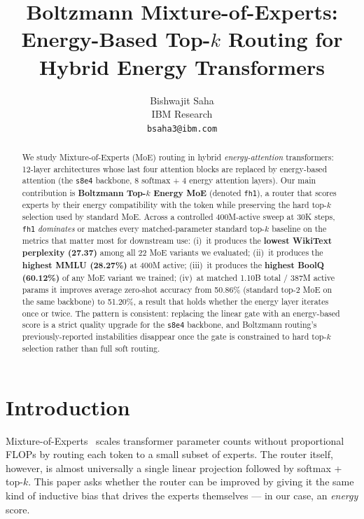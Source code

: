 \documentclass[oneside]{article}
\title{Boltzmann Mixture-of-Experts:\\Energy-Based Top-$k$ Routing for Hybrid Energy Transformers}
\author{
  Bishwajit Saha \\
  IBM Research \\
  \texttt{bsaha3@ibm.com}
}
\begin{document}
\maketitle

\begin{abstract}
We study Mixture-of-Experts (MoE) routing in hybrid \emph{energy-attention} transformers: 12-layer architectures whose last four attention blocks are replaced by energy-based attention (the \texttt{s8e4} backbone, 8 softmax + 4 energy attention layers). Our main contribution is \textbf{Boltzmann Top-$k$ Energy MoE} (denoted \texttt{fh1}), a router that scores experts by their energy compatibility with the token while preserving the hard top-$k$ selection used by standard MoE. Across a controlled 400M-active sweep at 30K steps, \texttt{fh1} \emph{dominates} or matches every matched-parameter standard top-$k$ baseline on the metrics that matter most for downstream use:
(i)~it produces the \textbf{lowest WikiText perplexity (27.37)} among all 22 MoE variants we evaluated;
(ii)~it produces the \textbf{highest MMLU (28.27\%)} at 400M active;
(iii)~it produces the \textbf{highest BoolQ (60.12\%)} of any MoE variant we trained;
(iv)~at matched 1.10B total / 387M active params it improves average zero-shot accuracy from 50.86\% (standard top-2 MoE on the same backbone) to 51.20\%, a result that holds whether the energy layer iterates once or twice.
The pattern is consistent: replacing the linear gate with an energy-based score is a strict quality upgrade for the \texttt{s8e4} backbone, and Boltzmann routing's previously-reported instabilities disappear once the gate is constrained to hard top-$k$ selection rather than full soft routing.
\end{abstract}


\section{Introduction}

Mixture-of-Experts~\citep{shazeer2017outrageously,fedus2022switch} scales transformer parameter counts without proportional FLOPs by routing each token to a small subset of experts. The router itself, however, is almost universally a single linear projection followed by softmax + top-$k$. This paper asks whether the router can be improved by giving it the same kind of inductive bias that drives the experts themselves --- in our case, an \emph{energy} score.
\end{document}
